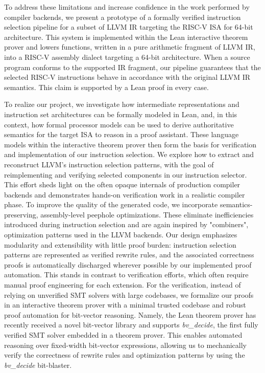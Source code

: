 \documentclass[review, anonymous, acmsmall, screen]{acmart}
\begin{document}
To address these limitations and increase confidence in the work performed by compiler backends, we 
present a prototype of a formally verified instruction selection pipeline for a subset of LLVM IR 
targeting the RISC-V ISA for 64-bit architecture. This system is implemented within the Lean interactive
theorem prover and lowers functions, written in a pure arithmetic fragment of LLVM IR, into a RISC-V
assembly dialect targeting a 64-bit architecture.  When a source program conforms to the supported
IR fragment, our pipeline guarantees that the selected RISC-V instructions behave in accordance 
with the original LLVM IR semantics. This claim is supported by a Lean proof in every case.

To realize our project, we investigate how intermediate representations and instruction set 
architectures can be formally modeled in Lean, and, in this context, how formal processor models 
can be used to derive authoritative semantics for the target ISA to reason in a proof assistant. 
These language models within the interactive theorem prover then form the basis for verification and 
implementation of our instruction selection. We explore how to extract and reconstruct LLVM’s 
instruction selection patterns, with the goal of reimplementing and verifying selected components 
in our instruction selector. This effort sheds light on the often opaque internals of production 
compiler backends and demonstrates hands-on verification work in a realistic compiler phase. To 
improve the quality of the generated code, we incorporate semantics-preserving, assembly-level 
peephole optimizations. These eliminate inefficiencies introduced during instruction selection and
are again inspired by "combiners", optimization patterns used in the LLVM backends.\newline
Our design emphasizes modularity and extensibility with little proof burden: instruction selection 
patterns are represented as verified rewrite rules, and the associated correctness proofs is 
automatically discharged wherever possible by our implemented proof automation. This stands in 
contrast to verification efforts, which often require  manual proof engineering for each extension. 
For the verification, instead of relying on unverified SMT solvers with large codebases, we formalize
our proofs in an interactive theorem prover with a minimal trusted codebase and robust proof automation
for bit-vector reasoning.\newline
Namely, the Lean theorem prover has recently received a novel bit-vector library and 
supports \textit{bv\_decide}, the first fully verified SMT solver embedded in a 
theorem prover. This enables automated reasoning over fixed-width bit-vector expressions, 
allowing us to mechanically verify the correctness of rewrite rules and optimization patterns by 
using the \textit{bv\_decide} bit-blaster.
\end{document}
